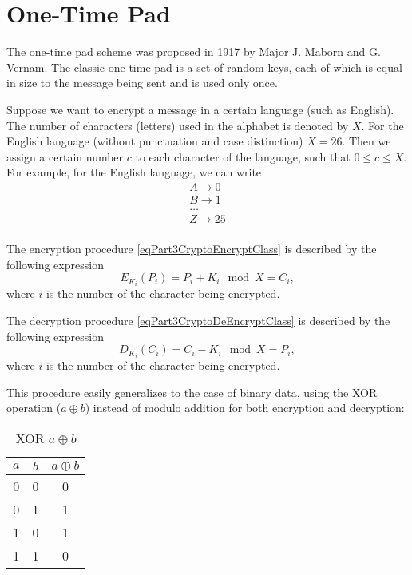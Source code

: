 \section{One-Time Pad}
The one-time pad scheme was proposed in 1917 by Major J. Maborn and G. Vernam. The classic one-time pad is a set of random keys, each of which is equal in size to the message being sent and is used only once.

Suppose we want to encrypt a message in a certain language (such as English). The number of characters (letters) used in the alphabet is denoted by $X$. For the English language (without punctuation and case distinction) $X = 26$. Then we assign a certain number $c$ to each character of the language, such that $0 \le c \le X$. For example, for the English language, we can write
\begin{equation}
\begin{array}{c}
A \rightarrow 0 \\
B \rightarrow 1 \\
\dots \\
Z \rightarrow 25 \\
\end{array}
\nonumber
\end{equation}

The encryption procedure \eqref{eqPart3CryptoEncryptClass} is described by the following expression
\begin{equation}
E_{K_i}\left(P_i\right) = P_i + K_i \mod X = C_i,
\label{eqPart3CryptoEncryptVernam}
\end{equation}
where $i$ is the number of the character being encrypted.

The decryption procedure \eqref{eqPart3CryptoDeEncryptClass} is described by the following expression
\begin{equation}
D_{K_i}\left(C_i\right) = C_i - K_i \mod X = P_i,
\label{eqPart3CryptoDeEncryptVernam}
\end{equation}
where $i$ is the number of the character being encrypted.

This procedure easily generalizes to the case of binary data, using the XOR operation ($a \oplus b$) instead of modulo addition for both encryption and decryption:
\begin{table}
\centering
\begin{tabular}{|c|c|c|}
\hline
$a$ & $b$ & $a \oplus b$ \\ \hline
0  & 0 & 0 \\
0  & 1 & 1 \\
1  & 0 & 1 \\
1  & 1 & 0 \\ \hline
\end{tabular}
\caption{XOR $a \oplus b$}
\label{tblXOR}
\end{table}

